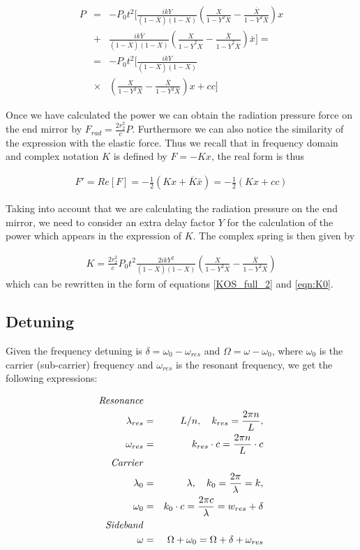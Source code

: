 \newpage
\begin{eqnarray}
P&=&-P_0t^2 [ \frac{ikY}{(1-\overline{X})(1-X)} \left( \frac{X}{1-Y^2 X}-\frac{\overline{X}}{1-Y^2\overline{X}} \right) x\nonumber\\
&+&\frac{ik\overline{Y}}{(1-\overline{X})(1-X)} \left( \frac{X}{1-\overline{Y}^2 X}-\frac{\overline{X}}{1-\overline{Y}^2\overline{X}} \right)\bar{x} ]=\nonumber \\
&=&-P_0t^2 [ \frac{ikY}{(1-\overline{X})(1-X)}\nonumber\\ 
&\times &\left( \frac{X}{1-Y^2 X}-\frac{\overline{X}}{1-Y^2\overline{X}} \right) x + cc ]
\end{eqnarray}

Once we have calculated the power we can obtain the radiation pressure force on the end mirror by $F_{rad}=\frac{2 r_2^2}{c}P$. Furthermore
we can also notice the similarity of the expression with the elastic force. Thus we recall that
in frequency domain and complex notation $K$ is defined by $F=-Kx$, the real form is thus

\begin{eqnarray*}
F'=Re[F]=-\frac{1}{2}(Kx+\overline{K}\bar{x})=-\frac{1}{2}(Kx+cc)
\end{eqnarray*}

Taking into account that we are calculating the radiation pressure on the end mirror, we need to consider an extra delay factor $Y$
for the calculation of the power which appears in the expression of $K$. The complex spring is then given by 

\begin{eqnarray*}
K=\frac{2 r_2^2}{c} P_0 t^2  \frac{2ikY^2}{(1-\overline{X})(1-X)} \left( \frac{X}{1-Y^2 X}-\frac{\overline{X}}{1-Y^2\overline{X}} \right) 
\end{eqnarray*}
which can be rewritten in the form of equations \ref{KOS_full_2}
and \ref{eqn:K0}.


\subsection*{Detuning}
Given the frequency detuning is $\delta=\omega_0-\omega_{res}$ and $\Omega=\omega-\omega_0$,
where $\omega_0$ is the carrier (sub-carrier) frequency and $\omega_{res}$ is the resonant frequency, we get the following expressions:

\begin{eqnarray}
\mbox{\textit{Resonance}}\nonumber\\ 
\lambda_{res}&=& L/n, \quad k_{res}=\frac{2\pi n}{L}, \nonumber\\ 
\omega_{res} & = & k_{res}\cdot c = \frac{2\pi n}{L} \cdot c\\
\mbox{\textit{Carrier}}\nonumber\\ 
\lambda_0 & = &\lambda,  \quad k_0=\frac{2\pi}{\lambda}=k, \nonumber\\ 
\omega_0 & = & k_0\cdot c=\frac{2\pi c}{\lambda}=w_{res}+\delta\\
\mbox{\textit{Sideband}}\nonumber\\
\omega &=& \Omega+\omega_0=\Omega+\delta+\omega_{res}
\end{eqnarray}

